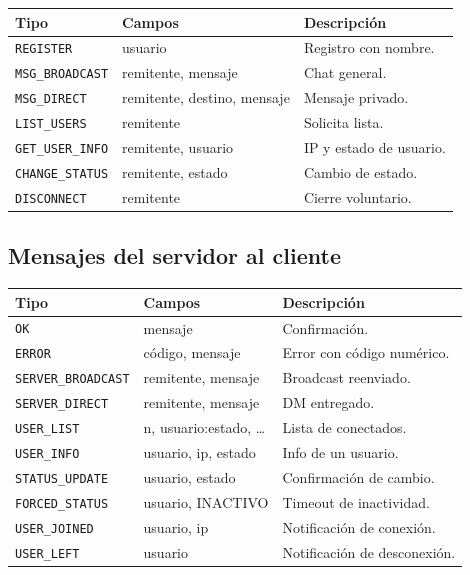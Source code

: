 \documentclass[12pt,a4paper]{article}
\begin{document}
\begin{center}
\begin{tabular}{llp{6cm}}
\toprule
\textbf{Tipo} & \textbf{Campos} & \textbf{Descripción} \\
\midrule
\texttt{REGISTER}        & usuario                     & Registro con nombre. \\
\texttt{MSG\_BROADCAST}  & remitente, mensaje           & Chat general. \\
\texttt{MSG\_DIRECT}     & remitente, destino, mensaje  & Mensaje privado. \\
\texttt{LIST\_USERS}     & remitente                    & Solicita lista. \\
\texttt{GET\_USER\_INFO} & remitente, usuario           & IP y estado de usuario. \\
\texttt{CHANGE\_STATUS}  & remitente, estado            & Cambio de estado. \\
\texttt{DISCONNECT}      & remitente                    & Cierre voluntario. \\
\bottomrule
\end{tabular}
\end{center}

\subsection{Mensajes del servidor al cliente}

\begin{center}
\begin{tabular}{llp{6cm}}
\toprule
\textbf{Tipo} & \textbf{Campos} & \textbf{Descripción} \\
\midrule
\texttt{OK}               & mensaje                & Confirmación. \\
\texttt{ERROR}            & código, mensaje         & Error con código numérico. \\
\texttt{SERVER\_BROADCAST} & remitente, mensaje      & Broadcast reenviado. \\
\texttt{SERVER\_DIRECT}   & remitente, mensaje       & DM entregado. \\
\texttt{USER\_LIST}       & n, usuario:estado, \ldots & Lista de conectados. \\
\texttt{USER\_INFO}       & usuario, ip, estado      & Info de un usuario. \\
\texttt{STATUS\_UPDATE}   & usuario, estado          & Confirmación de cambio. \\
\texttt{FORCED\_STATUS}   & usuario, INACTIVO        & Timeout de inactividad. \\
\texttt{USER\_JOINED}     & usuario, ip              & Notificación de conexión. \\
\texttt{USER\_LEFT}       & usuario                  & Notificación de desconexión. \\
\bottomrule
\end{tabular}
\end{center}
\end{document}
